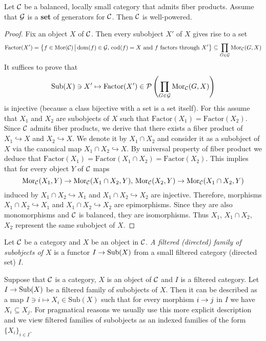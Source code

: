 \begin{proposition}\label{proposition:criterionforwellpoweredcategories}
Let ${\mathcal C}$ be a balanced, locally small category that admits fiber products. Assume that ${\mathcal G}$ is a \textbf{set} of generators for ${\mathcal C}$. Then ${\mathcal C}$ is well-powered. 
\end{proposition}
\begin{proof}
Fix an object $X$ of ${\mathcal C}$. Then every subobject $X'$ of $X$ gives rise to a set
$$\mathrm{Factor}(X') = \big\{f\in \mathrm{Mor}({\mathcal C})\,\big|\,\mathrm{dom}(f)\in {\mathcal G},\,\mathrm{cod}(f) = X\mbox{ and }f\mbox{ factors through }X'\big\}\subseteq \prod_{G\in {\mathcal G}}\mathrm{Mor}_{{\mathcal C}}(G,X)$$
It suffices to prove that 
$$\mathrm{Sub}(X)\ni X'\mapsto \mathrm{Factor}(X')\in {\mathcal P}\left(\prod_{G\in {\mathcal G}}\mathrm{Mor}_{{\mathcal C}}(G,X)\right)$$
is injective (because a class bijective with a set is a set itself). For this assume that $X_1$ and $X_2$ are subobjects of $X$ such that $\mathrm{Factor}(X_1) = \mathrm{Factor}(X_2)$. Since ${\mathcal C}$ admits fiber products, we derive that there exists a fiber product of $X_1\hookrightarrow X$ and $X_2\hookrightarrow X$. We denote it by $X_1\cap X_2$ and consider it as a subobject of $X$ via the canonical map $X_1\cap X_2 \hookrightarrow X$. By universal property of fiber product we deduce that $\mathrm{Factor}(X_1) = \mathrm{Factor}(X_1\cap X_2) = \mathrm{Factor}(X_2)$. This implies that for every object $Y$ of ${\mathcal C}$ maps
$$\mathrm{Mor}_{{\mathcal C}}(X_1,Y)\rightarrow \mathrm{Mor}_{{\mathcal C}}(X_1\cap X_2,Y),\,\mathrm{Mor}_{{\mathcal C}}(X_2,Y)\rightarrow \mathrm{Mor}_{{\mathcal C}}(X_1\cap X_2,Y)$$
induced by $X_1\cap X_2\hookrightarrow X_1$ and $X_1\cap X_2\hookrightarrow X_2$ are injective. Therefore, morphisms $X_1\cap X_2\hookrightarrow X_1$ and $X_1\cap X_2\hookrightarrow X_2$ are epimorphisms. Since they are also monomorphisms and ${\mathcal C}$ is balanced, they are isomorphisms. Thus $X_1$, $X_1\cap X_2$, $X_2$ represent the same subobject of $X$.
\end{proof}

\begin{definition}
Let ${\mathcal C}$ be a category and $X$ be an object in ${\mathcal C}$. \textit{A filtered (directed) family of subobjects of $X$} is a functor $I\rightarrow \mathrm{Sub}(X)$ from a small filtered category (directed set) $I$.
\end{definition}
\noindent
Suppose that ${\mathcal C}$ is a category, $X$ is an object of ${\mathcal C}$ and $I$ is a filtered category. Let $I\rightarrow \mathrm{Sub}(X)$ be a filtered family of subobjects of $X$. Then it can be described as a map $I\ni i \mapsto X_i\in \mathrm{Sub}(X)$ such that for every morphism $i\rightarrow j$ in $I$ we have $X_i\subseteq X_j$. For pragmatical reasons we usually use this more explicit description and we view filtered families of subobjects as an indexed families of the form $\{X_i\}_{i\in I}$.

